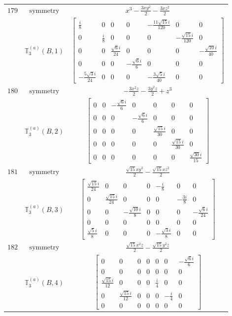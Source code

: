 \documentclass[fleqn,8pt,landscape]{jsarticle}
\begin{document}
\begin{longtable}{ccc}
$ 179 $ & $ \text{symmetry} $ & $ x^{3} - \frac{3 x y^{2}}{2} - \frac{3 x z^{2}}{2} $ \\
$  $ & $ \mathbb{T}_{3}^{(a)}(B,1) $ & $ \begin{bmatrix} \frac{i}{8} & 0 & 0 & 0 & - \frac{11 \sqrt{15} i}{120} & 0 & 0 \\ 0 & \frac{i}{8} & 0 & 0 & 0 & - \frac{\sqrt{15} i}{120} & 0 \\ 0 & 0 & \frac{\sqrt{6} i}{24} & 0 & 0 & 0 & - \frac{\sqrt{10} i}{40} \\ 0 & 0 & 0 & - \frac{\sqrt{6} i}{6} & 0 & 0 & 0 \\ - \frac{5 \sqrt{3} i}{24} & 0 & 0 & 0 & - \frac{3 \sqrt{5} i}{40} & 0 & 0 \end{bmatrix} $ \\ \hline
$ 180 $ & $ \text{symmetry} $ & $ - \frac{3 x^{2} z}{2} - \frac{3 y^{2} z}{2} + z^{3} $ \\
$  $ & $ \mathbb{T}_{3}^{(a)}(B,2) $ & $ \begin{bmatrix} 0 & 0 & - \frac{\sqrt{6} i}{6} & 0 & 0 & 0 & 0 \\ 0 & 0 & 0 & - \frac{\sqrt{6} i}{6} & 0 & 0 & 0 \\ 0 & 0 & 0 & 0 & \frac{\sqrt{15} i}{30} & 0 & 0 \\ 0 & 0 & 0 & 0 & 0 & \frac{\sqrt{15} i}{30} & 0 \\ 0 & 0 & 0 & 0 & 0 & 0 & \frac{\sqrt{30} i}{15} \end{bmatrix} $ \\ \hline
$ 181 $ & $ \text{symmetry} $ & $ \frac{\sqrt{15} x y^{2}}{2} - \frac{\sqrt{15} x z^{2}}{2} $ \\
$  $ & $ \mathbb{T}_{3}^{(a)}(B,3) $ & $ \begin{bmatrix} \frac{\sqrt{15} i}{24} & 0 & 0 & 0 & - \frac{i}{8} & 0 & 0 \\ 0 & \frac{\sqrt{15} i}{24} & 0 & 0 & 0 & - \frac{3 i}{8} & 0 \\ 0 & 0 & - \frac{\sqrt{10} i}{8} & 0 & 0 & 0 & - \frac{\sqrt{6} i}{24} \\ 0 & 0 & 0 & 0 & 0 & 0 & 0 \\ \frac{\sqrt{5} i}{8} & 0 & 0 & 0 & - \frac{\sqrt{3} i}{8} & 0 & 0 \end{bmatrix} $ \\ \hline
$ 182 $ & $ \text{symmetry} $ & $ \frac{\sqrt{15} x^{2} z}{2} - \frac{\sqrt{15} y^{2} z}{2} $ \\
$  $ & $ \mathbb{T}_{3}^{(a)}(B,4) $ & $ \begin{bmatrix} 0 & 0 & 0 & 0 & 0 & 0 & - \frac{\sqrt{6} i}{6} \\ 0 & 0 & 0 & 0 & 0 & 0 & 0 \\ \frac{\sqrt{15} i}{12} & 0 & 0 & 0 & \frac{i}{4} & 0 & 0 \\ 0 & \frac{\sqrt{15} i}{12} & 0 & 0 & 0 & - \frac{i}{4} & 0 \\ 0 & 0 & 0 & 0 & 0 & 0 & 0 \end{bmatrix} $ \\ \hline

\end{longtable}
\end{document}

